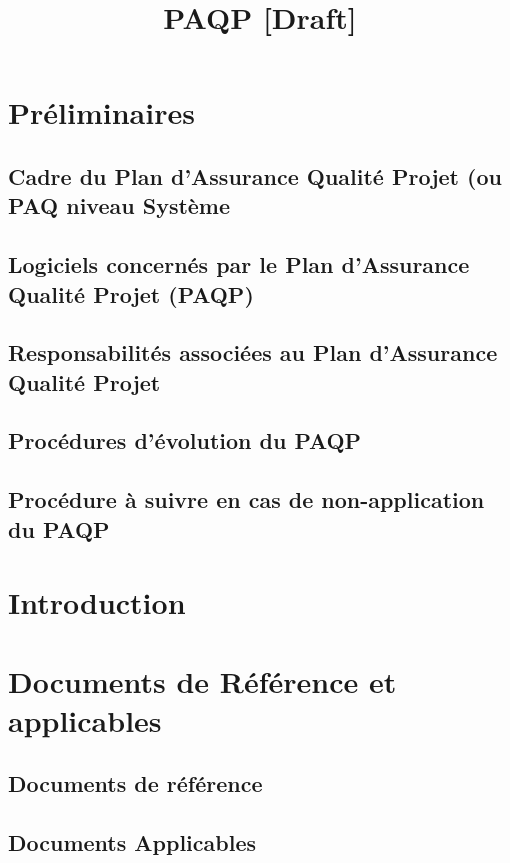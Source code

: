 \documentclass[a4paper]{article}
\begin{document}
\title{PAQP [Draft]}
\maketitle


\section{Préliminaires}
\subsection{Cadre du Plan d'Assurance Qualité Projet (ou PAQ niveau Système}
\subsection{Logiciels concernés par le Plan d'Assurance Qualité Projet (PAQP)}
\subsection{Responsabilités associées au Plan d'Assurance Qualité Projet}
\subsection{Procédures d'évolution du PAQP}
\subsection{Procédure à suivre en cas de non-application du  PAQP}

\section{Introduction}

\section{Documents de Référence et applicables}
\subsection{Documents de référence}
\subsection{Documents Applicables}
\end{document}
